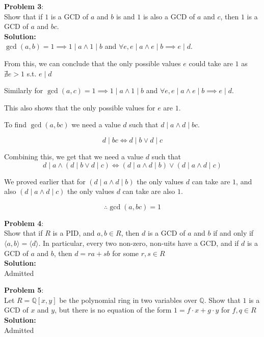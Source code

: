 \documentclass[11pt]{article}
\newcommand{\prob}[3]{\begin{flushleft}
        \textbf{Problem #1}: \\
        #2 
		\textbf{Solution:} 
		#3

\end{flushleft}}
\begin{document}
\prob{3}{
  Show that if $1$ is a GCD of $a$ and $b$ is and $1$ is also a GCD of $a$ and $c$, then $1$ is a GCD of $a$ and $bc$. \\
}{ \\
  $\gcd(a,b) = 1 \implies 1 \mid a \land 1 \mid b$ and $\forall e, e \mid a \land e \mid b \implies e \mid d$.

  From this, we can conclude that the only possible values $e$ could take are $1$ as $\nexists e > 1$ s.t. $e \mid d$

  Similarly for $\gcd(a,c) = 1 \implies 1 \mid a \land 1 \mid b$ and $\forall e, e \mid a \land e \mid b \implies e \mid d$.

  This also shows that the only possible values for $e$ are $1$.

  To find $\gcd(a, bc)$ we need a value $d$ such that $d \mid a \land d \mid bc$.

  $$d \mid bc \iff d \mid b \lor d \mid c$$

  Combining this, we get that we need a value $d$ such that
  $$d \mid a \land (d \mid b \lor d \mid c) \iff (d \mid a \land d \mid b) \lor (d \mid a \land d \mid c)$$

  We proved earlier that for $(d \mid a \land d \mid b)$ the only values $d$ can take are $1$, and also $(d \mid a \land d \mid c)$ the only values $d$ can take are also $1$.

  $$\therefore \gcd(a,bc) = 1$$
}

\prob{4}{
  Show that if $R$ is a PID, and $a, b \in R$, then $d$ is a GCD of $a$ and $b$ if and only if $\langle a, b \rangle = \langle d \rangle$.
  In particular, every two non-zero, non-uits have a GCD, and if $d$ is a GCD of $a$ and $b$, then $d = ra + sb$ for some $r, s \in R$ \\
}{ \\
  Admitted
}

\prob{5}{
  Let $R = \mathbb{Q}[x,y]$ be the polynomial ring in two variables over $\mathbb{Q}$. Show that $1$ is a GCD of $x$ and $y$,
  but there is no equation of the form $1 = f \cdot x + g \cdot y$ for $f, q \in R$ \\
}{ \\
  Admitted
}
\end{document}
